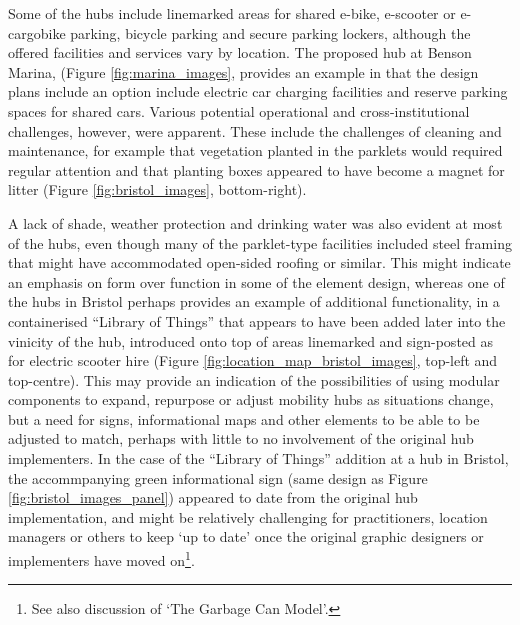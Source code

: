 \documentclass[preprint, 3p,
authoryear]{elsarticle} %
\begin{document}
Some of the hubs include linemarked areas for shared e-bike, e-scooter
or e-cargobike parking, bicycle parking and secure parking lockers,
although the offered facilities and services vary by location. The
proposed hub at Benson Marina, (Figure \ref{fig:marina_images}, provides
an example in that the design plans include an option include electric
car charging facilities and reserve parking spaces for shared cars.
Various potential operational and cross-institutional challenges,
however, were apparent. These include the challenges of cleaning and
maintenance, for example that vegetation planted in the parklets would
required regular attention and that planting boxes appeared to have
become a magnet for litter (Figure \ref{fig:bristol_images},
bottom-right).

A lack of shade, weather protection and drinking water was also evident
at most of the hubs, even though many of the parklet-type facilities
included steel framing that might have accommodated open-sided roofing
or similar. This might indicate an emphasis on form over function in
some of the element design, whereas one of the hubs in Bristol perhaps
provides an example of additional functionality, in a containerised
``Library of Things'' that appears to have been added later into the
vinicity of the hub, introduced onto top of areas linemarked and
sign-posted as for electric scooter hire (Figure
\ref{fig:location_map_bristol_images}, top-left and top-centre). This
may provide an indication of the possibilities of using modular
components to expand, repurpose or adjust mobility hubs as situations
change, but a need for signs, informational maps and other elements to
be able to be adjusted to match, perhaps with little to no involvement
of the original hub implementers. In the case of the ``Library of
Things'' addition at a hub in Bristol, the accommpanying green
informational sign (same design as Figure
\ref{fig:bristol_images_panel}) appeared to date from the original hub
implementation, and might be relatively challenging for practitioners,
location managers or others to keep `up to date' once the original
graphic designers or implementers have moved on\footnote{See also
  \cite{Reynolds:2017ah} discussion of `The Garbage Can Model'.}.
\end{document}
